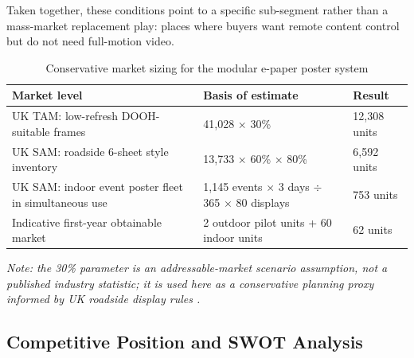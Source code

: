\documentclass[11pt,a4paper]{article}
\begin{document}
Taken together, these conditions point to a specific sub-segment rather than a mass-market replacement play: places where buyers want remote content control but do not need full-motion video.

\begin{table}[H]
\centering
\caption{Conservative market sizing for the modular e-paper poster system}
\footnotesize
\begin{tabularx}{\textwidth}{Y L{4.4cm} L{2.8cm}}
\toprule
\textbf{Market level} & \textbf{Basis of estimate} & \textbf{Result} \\
\midrule
UK TAM: low-refresh DOOH-suitable frames & 41,028 $\times$ 30\% & 12,308 units \\
UK SAM: roadside 6-sheet style inventory & 13,733 $\times$ 60\% $\times$ 80\% & 6,592 units \\
UK SAM: indoor event poster fleet in simultaneous use & 1,145 events $\times$ 3 days $\div$ 365 $\times$ 80 displays & 753 units \\
Indicative first-year obtainable market & 2 outdoor pilot units + 60 indoor units & 62 units \\
\bottomrule
\end{tabularx}
\end{table}

\textit{Note: the 30\% parameter is an addressable-market scenario assumption, not a published industry statistic; it is used here as a conservative planning proxy informed by UK roadside display rules \cite{ref3,ref5,ref6}.}

\subsection{Competitive Position and SWOT Analysis}
\end{document}
